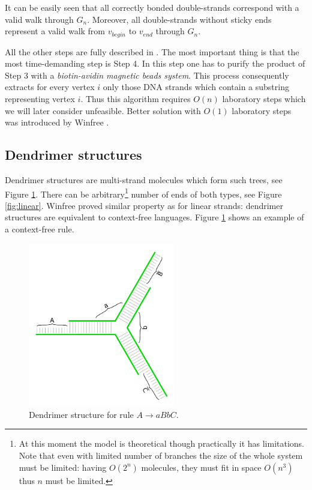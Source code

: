 		It can be easily seen that all correctly bonded double-strands correspond with a valid walk through $G_n$. Moreover, all double-strands without sticky ends represent a valid walk from $v_{begin}$ to $v_{end}$ through $G_n$.
		
		All the other steps are fully described in \cite{adleman94}. The most important thing is that the most time-demanding step is Step 4. In this step one has to purify the product of Step 3 with a {\em biotin-avidin magnetic beads system}. This process consequently extracts for every vertex $i$ only those DNA strands which contain a substring representing vertex $i$. Thus this algorithm requires $O(n)$ laboratory steps which we will later consider unfeasible. Better solution with $O(1)$ laboratory steps was introduced by Winfree \cite{winfree_phd}.
	
	\subsection{Dendrimer structures}
	\label{sec:dendrimer}
		
		Dendrimer structures are multi-strand molecules which form such trees, see Figure \ref{fig:dendrimer}. There can be arbitrary\footnote{At this moment the model is theoretical though practically it has limitations. Note that even with limited number of branches the size of the whole system must be limited: having $O(2^n)$ molecules, they must fit in space $O(n^3)$ thus $n$ must be limited.} number of ends of both types, see Figure \ref{fig:linear}. Winfree \cite{winfree_phd} proved similar property as for linear strands: dendrimer structures are equivalent to context-free languages. Figure \ref{fig:dendrimer} shows an example of a context-free rule.
		
		\begin{figure}[h]
		\begin{center}
			\includegraphics[width=0.568\textwidth]{./figures/strand_types/dendrimer.pdf}
			\caption{Dendrimer structure for rule $A\rightarrow aBbC$.}
			\label{fig:dendrimer}
		\end{center}
		\end{figure}
	
